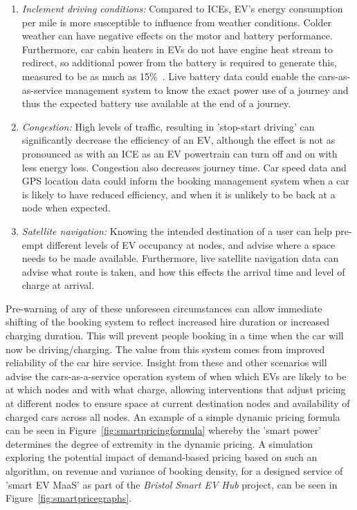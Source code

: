 \documentclass[journal]{IEEEtran}
\begin{document}
\begin{enumerate}
\item {\emph{Inclement driving conditions:}} Compared to ICEs, EV’s
energy consumption per mile is more susceptible to influence from
weather conditions. Colder weather can have negative effects on the
motor and battery performance. Furthermore, car cabin heaters in EVs 
do not have engine heat stream to redirect, so additional power
from the battery is required to generate this, measured to be as much
as 15\%~\cite{dft:2008}. Live battery data could enable the
cars-as-as-service management system to know the exact power use of a
journey and thus the expected battery use available at the end of a
journey.
\item {\emph{Congestion:}} High levels of traffic, resulting in
'stop-start driving’ can significantly decrease the efficiency of an
EV, although the effect is not as pronounced as with an ICE as an EV
powertrain can turn off and on with less energy loss. Congestion also
decreases journey time. Car speed data and GPS location data could
inform the booking management system when a car is likely to have
reduced efficiency, and when it is unlikely to be back at a node when
expected.
\item {\emph{Satellite navigation:}} Knowing the intended destination
of a user can help pre-empt different levels of EV occupancy at nodes,
and advise where a space needs to be made available. Furthermore, live
satellite navigation data can advise what route is taken, and how this
effects the arrival time and level of charge at arrival.
\end{enumerate}

Pre-warning of any of these unforeseen circumstances can allow
immediate shifting of the booking system to reflect increased hire
duration or increased charging duration. This will prevent people
booking in a time when the car will now be driving/charging. The value
from this system comes from improved reliability of the car hire
service.  Insight from these and other scenarios will advise the
cars-as-a-service operation system of when which EVs are likely to be
at which nodes and with what charge, allowing interventions that
adjust pricing at different nodes to ensure space at current
destination nodes and availability of charged cars across all nodes. An example of a simple dynamic pricing formula can be seen in Figure~\ref{fig:smartpricingformula} whereby the 'smart power' determines the degree of extremity in the dynamic pricing.
A simulation exploring the potential impact of demand-based pricing based on such an algorithm, on revenue and variance of booking density, for a designed service of 'smart EV MaaS' as part of the {\emph{Bristol Smart EV Hub}} project, can be seen in Figure~\ref{fig:smartpricegraphs}.
\end{document}
